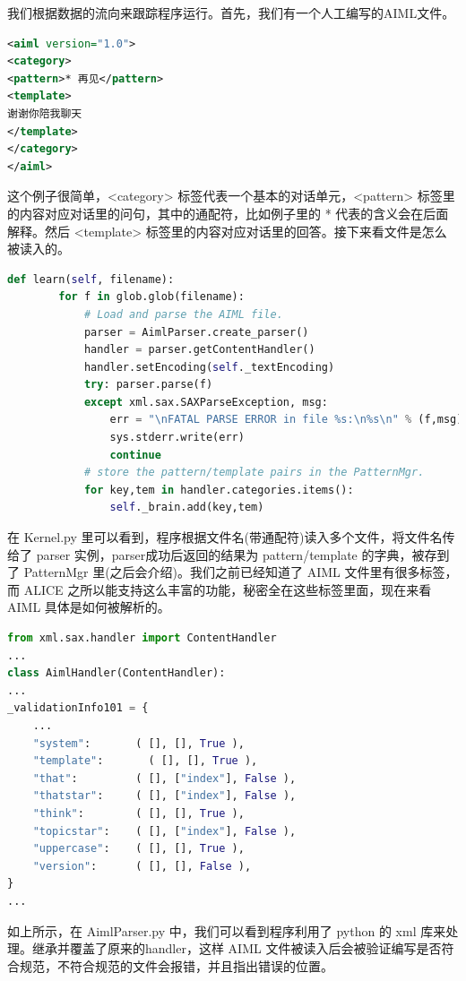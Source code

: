 \documentclass[bachelor,winfonts]{jnuthesis}
\begin{document}
我们根据数据的流向来跟踪程序运行。首先，我们有一个人工编写的AIML文件。

\begin{lstlisting}[language=XML]
<aiml version="1.0">
<category>
<pattern>* 再见</pattern>
<template>
谢谢你陪我聊天
</template>
</category>
</aiml>
\end{lstlisting}

这个例子很简单，<category> 标签代表一个基本的对话单元，<pattern> 标签里的内容对应对话里的问句，其中的通配符，比如例子里的 * 代表的含义会在后面解释。然后 <template> 标签里的内容对应对话里的回答。接下来看文件是怎么被读入的。

\begin{lstlisting}[language=Python]
 def learn(self, filename):
        for f in glob.glob(filename):
            # Load and parse the AIML file.
            parser = AimlParser.create_parser()
            handler = parser.getContentHandler()
            handler.setEncoding(self._textEncoding)
            try: parser.parse(f)
            except xml.sax.SAXParseException, msg:
                err = "\nFATAL PARSE ERROR in file %s:\n%s\n" % (f,msg)
                sys.stderr.write(err)
                continue
            # store the pattern/template pairs in the PatternMgr.
            for key,tem in handler.categories.items():
                self._brain.add(key,tem)
\end{lstlisting}

在 Kernel.py 里可以看到，程序根据文件名(带通配符)读入多个文件，将文件名传给了 parser 实例，parser成功后返回的结果为 pattern/template 的字典，被存到了 PatternMgr 里(之后会介绍)。我们之前已经知道了 AIML 文件里有很多标签，而 ALICE 之所以能支持这么丰富的功能，秘密全在这些标签里面，现在来看 AIML 具体是如何被解析的。

\begin{lstlisting}[language=Python]
from xml.sax.handler import ContentHandler
...
class AimlHandler(ContentHandler):
...
_validationInfo101 = {
    ...
    "system":       ( [], [], True ),
    "template":		  ( [], [], True ),
    "that":         ( [], ["index"], False ),
    "thatstar":     ( [], ["index"], False ),
    "think":        ( [], [], True ),
    "topicstar":    ( [], ["index"], False ),
    "uppercase":    ( [], [], True ),
    "version":      ( [], [], False ),
}
...
\end{lstlisting}


如上所示，在 AimlParser.py 中，我们可以看到程序利用了 python 的 xml 库来处理。继承并覆盖了原来的handler，这样 AIML 文件被读入后会被验证编写是否符合规范，不符合规范的文件会报错，并且指出错误的位置。
\end{document}
